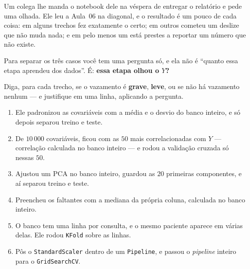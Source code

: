 \documentclass[11pt,a4paper]{article}
\begin{document}

\begin{exercicio}
Um colega lhe manda o notebook dele na véspera de entregar o relatório e pede uma
olhada. Ele leu a Aula~06 na diagonal, e o resultado é um pouco de cada coisa: em
alguns trechos fez exatamente o certo; em outros cometeu um deslize que não muda
nada; e em pelo menos um está prestes a reportar um número que não existe.

Para separar os três casos você tem uma pergunta só, e ela não é ``quanto essa
etapa aprendeu dos dados''. É: \textbf{essa etapa olhou o $Y$?}

Diga, para cada trecho, se o vazamento é \textbf{grave}, \textbf{leve}, ou se não
há vazamento nenhum --- e justifique em uma linha, aplicando a pergunta.
\begin{enumerate}[label=(\alph*),leftmargin=1.1cm]
  \item Ele padronizou as covariáveis com a média e o desvio do banco inteiro, e
        só depois separou treino e teste.
  \item De $10\,000$ covariáveis, ficou com as $50$ mais correlacionadas com $Y$
        --- correlação calculada no banco inteiro --- e rodou a validação cruzada
        só nessas $50$.
  \item Ajustou um PCA no banco inteiro, guardou as $20$ primeiras componentes, e
        aí separou treino e teste.
  \item Preencheu os faltantes com a mediana da própria coluna, calculada no banco
        inteiro.
  \item O banco tem uma linha por consulta, e o mesmo paciente aparece em várias
        delas. Ele rodou \texttt{KFold} sobre as linhas.
  \item Pôs o \texttt{StandardScaler} dentro de um \texttt{Pipeline}, e passou o
        \emph{pipeline} inteiro para o \texttt{GridSearchCV}.
\end{enumerate}
\end{exercicio}
\end{document}

